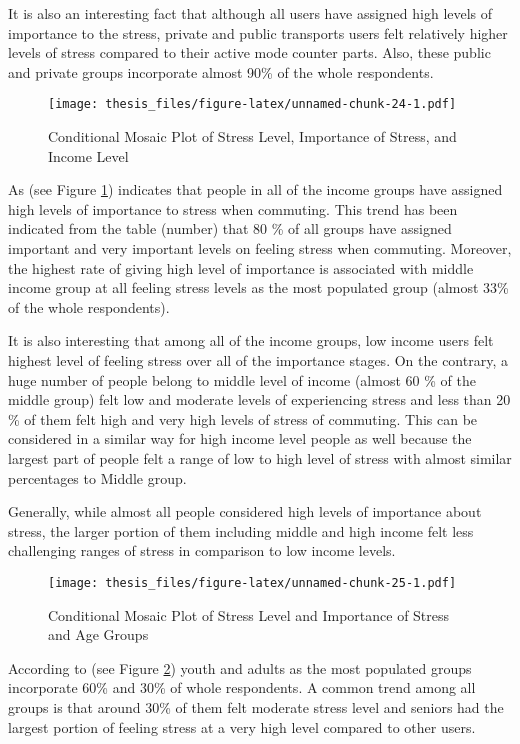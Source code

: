 \documentclass[
11pt, %
oneside, %
english, %
singlespacing, %
]{macthesis} %
\begin{document}
It is also an interesting fact that although all users have assigned high levels of importance to the stress, private and public transports users felt relatively higher levels of stress compared to their active mode counter parts. Also, these public and private groups incorporate almost 90\% of the whole respondents.
\begin{figure}
\centering
\texttt{[image: thesis\_files/figure-latex/unnamed-chunk-24-1.pdf]}
\caption{\label{fig:unnamed-chunk-24}\label{fig:stress importance of stress and income}Conditional Mosaic Plot of Stress Level, Importance of Stress, and Income Level}
\end{figure}
As (see Figure \ref{fig:stress importance of stress and income}) indicates that people in all of the income groups have assigned high levels of importance to stress when commuting. This trend has been indicated from the table (number) that 80 \% of all groups have assigned important and very important levels on feeling stress when commuting. Moreover, the highest rate of giving high level of importance is associated with middle income group at all feeling stress levels as the most populated group (almost 33\% of the whole respondents).

It is also interesting that among all of the income groups, low income users felt highest level of feeling stress over all of the importance stages. On the contrary, a huge number of people belong to middle level of income (almost 60 \% of the middle group) felt low and moderate levels of experiencing stress and less than 20 \% of them felt high and very high levels of stress of commuting. This can be considered in a similar way for high income level people as well because the largest part of people felt a range of low to high level of stress with almost similar percentages to Middle group.

Generally, while almost all people considered high levels of importance about stress, the larger portion of them including middle and high income felt less challenging ranges of stress in comparison to low income levels.
\begin{figure}
\centering
\texttt{[image: thesis\_files/figure-latex/unnamed-chunk-25-1.pdf]}
\caption{\label{fig:unnamed-chunk-25}\label{fig:stress importance of stress and age}Conditional Mosaic Plot of Stress Level and Importance of Stress and Age Groups}
\end{figure}
According to (see Figure \ref{fig:stress importance of stress and age}) youth and adults as the most populated groups incorporate 60\% and 30\% of whole respondents. A common trend among all groups is that around 30\% of them felt moderate stress level and seniors had the largest portion of feeling stress at a very high level compared to other users.
\end{document}
